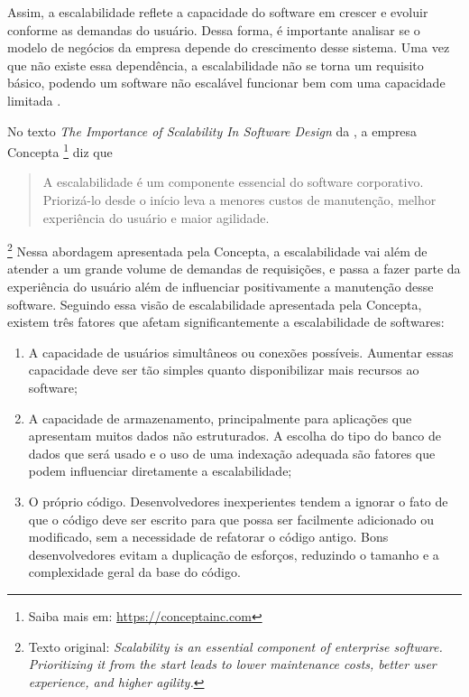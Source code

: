 Assim, a escalabilidade reflete a capacidade do software em crescer e evoluir
conforme as demandas do usuário. Dessa forma, é importante analisar se o
modelo de negócios da empresa depende do crescimento desse sistema. Uma vez que
não existe essa dependência, a escalabilidade não se torna um requisito básico,
podendo um software não escalável funcionar bem com uma capacidade limitada
\cite{ConceptaScalability}.

No texto \textit{The Importance of Scalability In Software Design}
da , a empresa Concepta
\footnote{Saiba mais em: \url{https://conceptainc.com}} diz que \begin{quote}
A escalabilidade é um componente essencial do software corporativo. Priorizá-lo
desde o início leva a menores custos de manutenção, melhor experiência do usuário
e maior agilidade.\end{quote}\footnote{Texto original: \textit{Scalability is an
essential component of enterprise software. Prioritizing it from the start leads
to lower maintenance costs, better user experience, and higher agility.}} Nessa
abordagem apresentada pela Concepta, a escalabilidade vai além de atender a um
grande volume de demandas de requisições, e passa a fazer parte da experiência
do usuário além de influenciar positivamente a manutenção desse software. Seguindo
essa visão de escalabilidade apresentada pela Concepta, existem três fatores que
afetam significantemente a escalabilidade de softwares:

  \begin{enumerate}
    \item A capacidade de usuários simultâneos ou conexões possíveis.
    Aumentar essas capacidade deve ser tão simples quanto disponibilizar mais
    recursos ao software;
    \item A capacidade de armazenamento, principalmente para aplicações
    que apresentam muitos dados não estruturados. A escolha do tipo do banco de
    dados que será usado e o uso de uma indexação adequada são fatores que
    podem influenciar diretamente a escalabilidade;
    \item O próprio código. Desenvolvedores inexperientes tendem a ignorar
    o fato de que o código deve ser escrito para que possa ser facilmente
    adicionado ou modificado, sem a necessidade de refatorar o código antigo.
    Bons desenvolvedores evitam a duplicação de esforços, reduzindo o tamanho
    e a complexidade geral da base do código.
  \end{enumerate}


